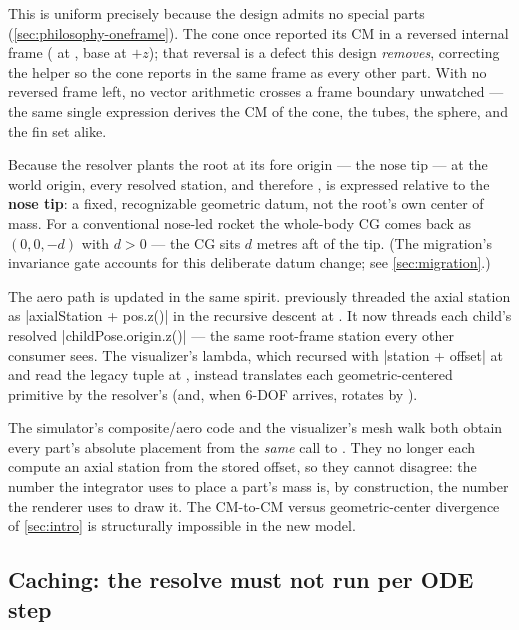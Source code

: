 This is uniform precisely because the design admits no special parts (\cref{sec:philosophy-oneframe}).
The cone once reported its CM in a reversed internal frame ( at
, base at $+z$); that reversal is a defect this design
\emph{removes}, correcting the helper so the cone reports in the same frame as every other part. With
no reversed frame left, no vector arithmetic crosses a frame boundary unwatched --- the same single
expression derives the CM of the cone, the tubes, the sphere, and the fin set alike.

Because the resolver plants the root at its fore origin --- the nose tip --- at the world origin, every
resolved station, and therefore , is expressed relative to the \textbf{nose tip}:
a fixed, recognizable geometric datum, not the root's own center of mass. For a conventional nose-led
rocket the whole-body CG comes back as $(0, 0, -d)$ with $d > 0$ --- the CG sits $d$ metres aft of the
tip. (The migration's invariance gate accounts for this deliberate datum change; see \cref{sec:migration}.)

The aero path is updated in the same spirit.  previously threaded the axial
station as \cppinline|axialStation + pos.z()| in the recursive descent at
. It now threads each child's resolved \cppinline|childPose.origin.z()|
--- the same root-frame station every other consumer sees. The visualizer's  lambda,
which recursed with \cppinline|station + offset| at  and read the
legacy tuple at , instead translates each geometric-centered
primitive by the resolver's  (and, when 6-DOF arrives, rotates by
).

\begin{designrule}
The simulator's composite/aero code and the visualizer's mesh walk both obtain every part's absolute
placement from the \emph{same} call to . They no longer each compute an axial
station from the stored offset, so they cannot disagree: the number the integrator uses to place a
part's mass is, by construction, the number the renderer uses to draw it. The CM-to-CM versus
geometric-center divergence of \cref{sec:intro} is structurally impossible in the new model.
\end{designrule}

\subsection{Caching: the resolve must not run per ODE step}

